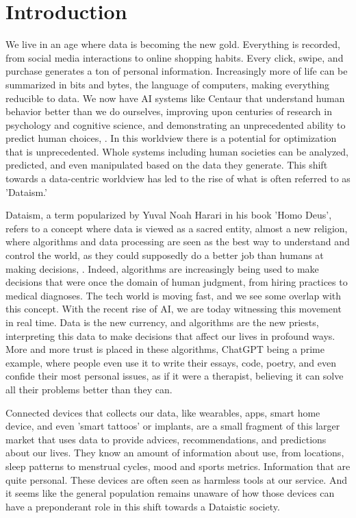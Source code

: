 
\section{Introduction}
We live in an age where data is becoming the new gold. Everything is recorded, from social media interactions to online shopping habits. Every click, swipe, and purchase generates a ton of personal information. Increasingly more of life can be summarized in bits and bytes, the language of computers, making everything reducible to data. We now have AI systems like Centaur that understand human behavior better than we do ourselves, improving upon centuries of research in psychology and cognitive science, and demonstrating an unprecedented ability to predict human choices, \cite{Binz2025}. In this worldview there is a potential for optimization that is unprecedented. Whole systems including human societies can be analyzed, predicted, and even manipulated based on the data they generate. This shift towards a data-centric worldview has led to the rise of what is often referred to as 'Dataism.'

Dataism, a term popularized by Yuval Noah Harari in his book 'Homo Deus', refers to a concept where data is viewed as a sacred entity, almost a new religion, where algorithms and data processing are seen as the best way to understand and control the world, as they could supposedly do a better job than humans at making decisions, \cite{Harari2017}. Indeed, algorithms are increasingly being used to make decisions that were once the domain of human judgment, from hiring practices to medical diagnoses. The tech world is moving fast, and we see some overlap with this concept. With the recent rise of AI, we are today witnessing this movement in real time. Data is the new currency, and algorithms are the new priests, interpreting this data to make decisions that affect our lives in profound ways. More and more trust is placed in these algorithms, ChatGPT being a prime example, where people even use it to write their essays, code, poetry, and even confide their most personal issues, as if it were a therapist, believing it can solve all their problems better than they can.

Connected devices that collects our data, like wearables, apps, smart home device, and even 'smart tattoos' or implants, are a small fragment of this larger market that uses data to provide advices, recommendations, and predictions about our lives. They know an amount of information about use, from locations, sleep patterns to menstrual cycles, mood and sports metrics. Information that are quite personal. These devices are often seen as harmless tools at our service. And it seems like the general population remains unaware of how those devices can have a preponderant role in this shift towards a Dataistic society.


